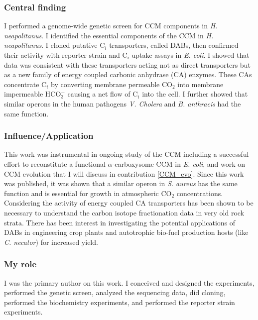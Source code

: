 \documentclass{article}
\begin{document}
\subsubsection{Central finding}
I performed a genome-wide genetic screen for CCM components in \textit{H. neapolitanus}. 
I identified the essential components of the CCM in \textit{H. neapolitanus}.
I cloned putative C$_i$ transporters, called DABs, then confirmed their activity with reporter strain and C$_i$ uptake assays in \textit{E. coli}. 
I showed that data was consistent with these transporters acting not as direct transporters but as a new family of energy coupled carbonic anhydrase (CA) enzymes.
These CAs concentrate C$_i$ by converting membrane permeable CO$_2$ into membrane impermeable HCO$_{3}^{-}$ causing a net flow of C$_i$ into the cell.
I further showed that similar operons in the human pathogens \textit{V. Cholera} and \textit{B. anthracis} had the same function.
%
\subsubsection{Influence/Application}
This work was instrumental in ongoing study of the CCM including a successful effort to reconstitute a functional $\alpha$-carboxysome CCM in \textit{E. coli}, and work on CCM evolution that I will discuss in contribution \ref{CCM_evo}. 
Since this work was published, it was shown that a similar operon in \textit{S. aureus} has the same function and is essential for growth in atmospheric CO$_2$ concentrations. 
Considering the activity of energy coupled CA transporters has been shown to be necessary to understand the carbon isotope fractionation data in very old rock strata.
There has been interest in investigating the potential applications of DABs in engineering crop plants and autotrophic bio-fuel production hosts (like \textit{C. necator}) for increased yield.
%
\subsubsection{My role}
I was the primary author on this work.
I conceived and designed the experiments, performed the genetic screen, analyzed the sequencing data, did cloning, performed the biochemistry experiments, and performed the reporter strain experiments.
%
\nocite{Desmarais2019-yc,Desmarais2018-ac,Desmarais2019-dc}
\printbibliography[heading=none]

\leavevmode\pagebreak
\end{document}
